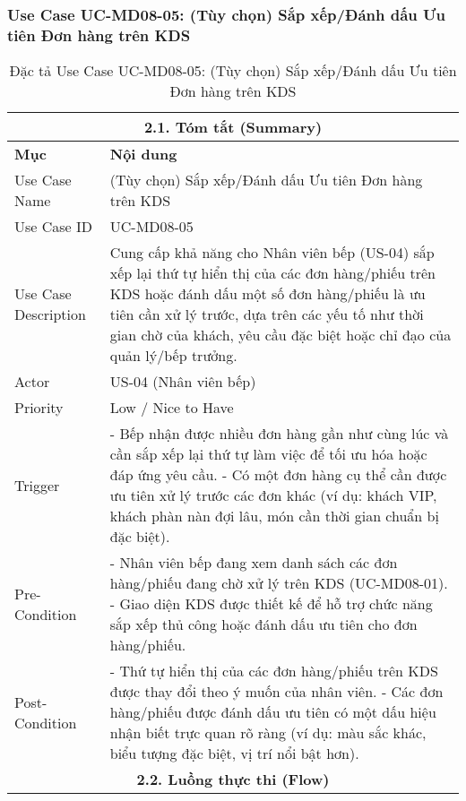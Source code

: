 \subsubsection{Use Case UC-MD08-05: (Tùy chọn) Sắp xếp/Đánh dấu Ưu tiên Đơn hàng trên KDS}
\begin{longtable}{|m{4cm}|p{11cm}|}
\caption{Đặc tả Use Case UC-MD08-05: (Tùy chọn) Sắp xếp/Đánh dấu Ưu tiên Đơn hàng trên KDS} \label{tab:uc_md08_05_final_v2} \\
\hline
\multicolumn{2}{|c|}{\textbf{2.1. Tóm tắt (Summary)}} \\
\hline
\textbf{Mục} & \textbf{Nội dung} \\
\hline
\endhead %
\hline
\endfoot %
\hline
\endlastfoot %
Use Case Name & (Tùy chọn) Sắp xếp/Đánh dấu Ưu tiên Đơn hàng trên KDS \\
\hline
Use Case ID & UC-MD08-05 \\
\hline
Use Case Description & Cung cấp khả năng cho Nhân viên bếp (US-04) sắp xếp lại thứ tự hiển thị của các đơn hàng/phiếu trên KDS hoặc đánh dấu một số đơn hàng/phiếu là ưu tiên cần xử lý trước, dựa trên các yếu tố như thời gian chờ của khách, yêu cầu đặc biệt hoặc chỉ đạo của quản lý/bếp trưởng. \\
\hline
Actor & US-04 (Nhân viên bếp) \\
\hline
Priority & Low / Nice to Have \\
\hline
Trigger & - Bếp nhận được nhiều đơn hàng gần như cùng lúc và cần sắp xếp lại thứ tự làm việc để tối ưu hóa hoặc đáp ứng yêu cầu. \newline - Có một đơn hàng cụ thể cần được ưu tiên xử lý trước các đơn khác (ví dụ: khách VIP, khách phàn nàn đợi lâu, món cần thời gian chuẩn bị đặc biệt). \\
\hline
Pre-Condition & - Nhân viên bếp đang xem danh sách các đơn hàng/phiếu đang chờ xử lý trên KDS (UC-MD08-01). \newline - Giao diện KDS được thiết kế để hỗ trợ chức năng sắp xếp thủ công hoặc đánh dấu ưu tiên cho đơn hàng/phiếu. \\
\hline
Post-Condition & - Thứ tự hiển thị của các đơn hàng/phiếu trên KDS được thay đổi theo ý muốn của nhân viên. \newline - Các đơn hàng/phiếu được đánh dấu ưu tiên có một dấu hiệu nhận biết trực quan rõ ràng (ví dụ: màu sắc khác, biểu tượng đặc biệt, vị trí nổi bật hơn). \\
\hline
\multicolumn{2}{|c|}{\textbf{2.2. Luồng thực thi (Flow)}} \\

\end{longtable}
